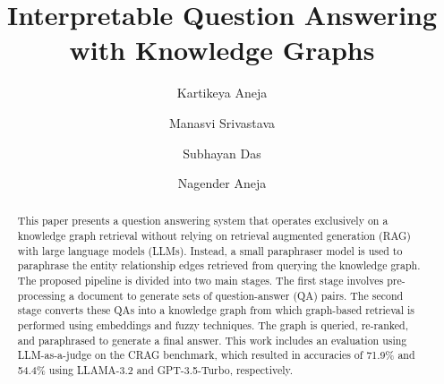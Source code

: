 \documentclass[runningheads]{llncs}
\begin{document}
\title{Interpretable Question Answering with Knowledge Graphs}

\author{
Kartikeya Aneja%
\and
Manasvi Srivastava%
\and 
Subhayan Das%
\and
Nagender Aneja%
}
%

%
\maketitle              %
%

\thispagestyle{plain}


\begin{abstract}
This paper presents a question answering system that operates exclusively on a knowledge graph retrieval without relying on retrieval augmented generation (RAG) with large language models (LLMs). Instead, a small paraphraser model is used to paraphrase the entity relationship edges retrieved from querying the knowledge graph. The proposed pipeline is divided into two main stages. The first stage involves pre-processing a document to generate sets of question-answer (QA) pairs. The second stage converts these QAs into a knowledge graph from which graph-based retrieval is performed using embeddings and fuzzy techniques. The graph is queried, re-ranked, and paraphrased to generate a final answer. This work includes an evaluation using LLM-as-a-judge on the CRAG benchmark, which resulted in accuracies of 71.9\% and 54.4\% using LLAMA-3.2 and GPT-3.5-Turbo, respectively.

\end{abstract}





\end{document}
